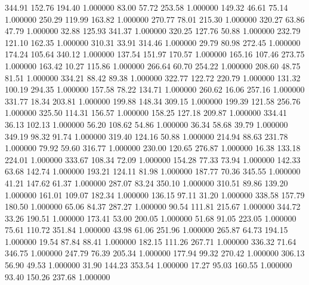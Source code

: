     344.91    152.76    194.40  1.000000
     83.00     57.72    253.58  1.000000
    149.32     46.61     75.14  1.000000
    250.29    119.99    163.82  1.000000
    270.77     78.01    215.30  1.000000
    320.27     63.86     47.79  1.000000
     32.88    125.93    341.37  1.000000
    320.25    127.76     50.88  1.000000
    232.79    121.10    162.35  1.000000
    310.31     33.91    314.46  1.000000
     29.79     80.98    272.45  1.000000
    174.24    105.64    340.12  1.000000
    137.54    151.97    170.57  1.000000
    165.16    107.46    273.75  1.000000
    163.42     10.27    115.86  1.000000
    266.64     60.70    254.22  1.000000
    208.60     48.75     81.51  1.000000
    334.21     88.42     89.38  1.000000
    322.77    122.72    220.79  1.000000
    131.32    100.19    294.35  1.000000
    157.58     78.22    134.71  1.000000
    260.62     16.06    257.16  1.000000
    331.77     18.34    203.81  1.000000
    199.88    148.34    309.15  1.000000
    199.39    121.58    256.76  1.000000
    325.50    114.31    156.57  1.000000
    158.25    127.18    209.87  1.000000
    334.41     36.13    102.13  1.000000
     56.20    108.62     54.86  1.000000
     36.34     58.68     39.79  1.000000
    349.19     98.32     91.74  1.000000
    319.40    124.16     50.88  1.000000
    214.94     88.63    231.78  1.000000
     79.92     59.60    316.77  1.000000
    230.00    120.65    276.87  1.000000
     16.38    133.18    224.01  1.000000
    333.67    108.34     72.09  1.000000
    154.28     77.33     73.94  1.000000
    142.33     63.68    142.74  1.000000
    193.21    124.11     81.98  1.000000
    187.77     70.36    345.55  1.000000
     41.21    147.62     61.37  1.000000
    287.07     83.24    350.10  1.000000
    310.51     89.86    139.20  1.000000
    161.01    109.07    182.34  1.000000
    136.15     97.11     31.20  1.000000
    338.58    157.79    180.50  1.000000
     65.06     84.37    287.27  1.000000
     90.54    111.81    215.67  1.000000
    344.72     33.26    190.51  1.000000
    173.41     53.00    200.05  1.000000
     51.68     91.05    223.05  1.000000
     75.61    110.72    351.84  1.000000
     43.98     61.06    251.96  1.000000
    265.87     64.73    194.15  1.000000
     19.54     87.84     88.41  1.000000
    182.15    111.26    267.71  1.000000
    336.32     71.64    346.75  1.000000
    247.79     76.39    205.34  1.000000
    177.94     99.32    270.42  1.000000
    306.13     56.90     49.53  1.000000
     31.90    144.23    353.54  1.000000
     17.27     95.03    160.55  1.000000
     93.40    150.26    237.68  1.000000
